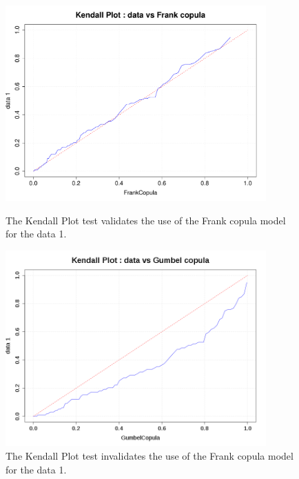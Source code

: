              \begin{figure}[H]
               \begin{minipage}{10cm}
                 \begin{center}
                   \includegraphics[width=10cm]{Figures/KendallPlotCopula.pdf}
                 \end{center}
                 \caption{The Kendall Plot test validates the use of the Frank copula model for the data 1.}
                 \label{GoodCop}
               \end{minipage}
               \hfill
               \begin{minipage}{10cm}
                 \begin{center}
                   \includegraphics[width=10cm]{Figures/KendallPlotCopulaBad.png}
                 \end{center}
                 \caption{The Kendall Plot test invalidates the use of the Frank copula model for the data 1.}
                 \label{BadCop}
               \end{minipage}
             \end{figure}


